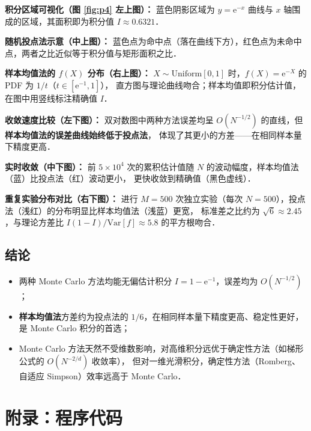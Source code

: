 \documentclass[UTF8,a4paper,11pt]{article}
\begin{document}
\noindent\textbf{积分区域可视化（图 \ref{fig:p4} 左上图）：}
蓝色阴影区域为 $y=\mathrm{e}^{-x}$ 曲线与 $x$ 轴围成的区域，其面积即为积分值 $I\approx0.6321$．

\noindent\textbf{随机投点法示意（中上图）：}
蓝色点为命中点（落在曲线下方），红色点为未命中点，两者之比近似等于积分值与矩形面积之比．

\noindent\textbf{样本均值法的 $f(X)$ 分布（右上图）：}
$X\sim\mathrm{Uniform}[0,1]$ 时，$f(X)=\mathrm{e}^{-X}$ 的 PDF 为 $1/t$（$t\in[\mathrm{e}^{-1},1]$），
直方图与理论曲线吻合；样本均值即积分估计值，在图中用竖线标注精确值 $I$．

\noindent\textbf{收敛速度比较（左下图）：}
双对数图中两种方法误差均呈 $O(N^{-1/2})$ 的直线，但\textbf{样本均值法的误差曲线始终低于投点法}，
体现了其更小的方差——在相同样本量下精度更高．

\noindent\textbf{实时收敛（中下图）：}
前 $5\times10^4$ 次的累积估计值随 $N$ 的波动幅度，样本均值法（蓝）比投点法（红）波动更小，
更快收敛到精确值（黑色虚线）．

\noindent\textbf{重复实验分布对比（右下图）：}
进行 $M=500$ 次独立实验（每次 $N=500$），投点法（浅红）的分布明显比样本均值法（浅蓝）更宽，
标准差之比约为 $\sqrt{6}\approx2.45$，与理论方差比 $I(1-I)/\mathrm{Var}[f]\approx5.8$ 的平方根吻合．

\subsection{结论}

\begin{itemize}
  \item 两种 Monte Carlo 方法均能无偏估计积分 $I=1-\mathrm{e}^{-1}$，误差均为 $O(N^{-1/2})$；
  \item \textbf{样本均值法}方差约为投点法的 $1/6$，在相同样本量下精度更高、稳定性更好，是 Monte Carlo 积分的首选；
  \item Monte Carlo 方法天然不受维数影响，对高维积分远优于确定性方法（如梯形公式的 $O(N^{-2/d})$ 收敛率），
    但对一维光滑积分，确定性方法（Romberg、自适应 Simpson）效率远高于 Monte Carlo．
\end{itemize}

\clearpage

\section{附录：程序代码}
\end{document}
